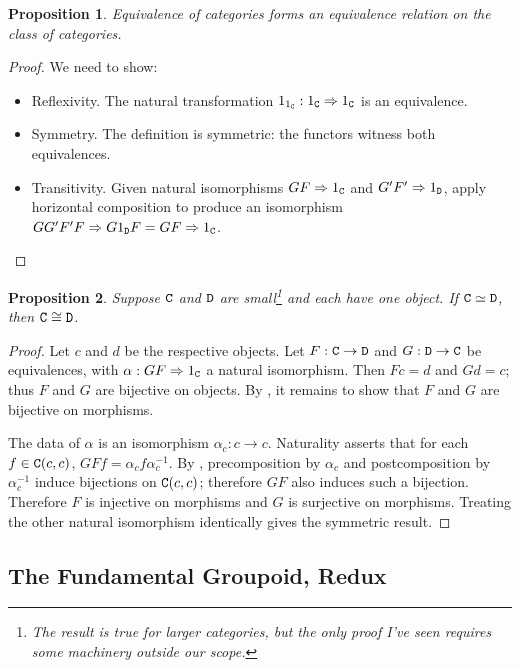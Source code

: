 \documentclass[11 pt]{amsart}
\theoremstyle{plain}   %
\newtheorem{prop}{Proposition}[section]
\theoremstyle{definition}
\theoremstyle{remark}
\numberwithin{equation}{section}
\def\nat{\Rightarrow}
\newcommand{\cat}[1]{{\normalfont\texttt{#1}}}
\begin{document}
\begin{prop}\label{equivalence is equivalence}
	Equivalence of categories forms an equivalence relation on the class of
	categories.
\end{prop}
\begin{proof}
	We need to show:
	\begin{itemize}
		\item Reflexivity. The natural transformation $1_{1_\cat{C}}:
			      1_\cat{C}\nat1_\cat{C}$ is an equivalence.
		\item Symmetry. The definition is symmetric: the functors witness both
		      equivalences.
		\item Transitivity. Given natural isomorphisms $GF\nat 1_\cat{C}$ and
		      $G'F'\nat1_\cat{D}$, apply horizontal composition to produce an
		      isomorphism $GG'F'F\nat G1_\cat{D}F=GF\nat 1_\cat{C}$. \qedhere
	\end{itemize}
\end{proof}

\begin{prop}\label{one object equivalence is isomorphism}
	Suppose $\cat{C}$ and $\cat{D}$ are small\footnote{The result is true for
		larger categories, but the only proof I've seen requires some machinery
		outside our scope.} and each have one object. If $\cat{C}\simeq\cat{D}$, then
	$\cat{C}\cong\cat{D}$.
\end{prop}

\begin{proof}
	Let $c$ and $d$ be the respective objects. Let $F:\cat{C}\rightarrow\cat{D}$
	and $G: \cat{D}\rightarrow\cat{C}$ be equivalences, with $\alpha:
		GF\nat 1_\cat{C}$ a natural isomorphism. Then $Fc = d$ and $Gd = c$;
	thus $F$ and $G$ are bijective on objects. By , it remains to show that $F$ and $G$ are bijective on morphisms.

	The data of $\alpha$ is an isomorphism $\alpha_c: c\rightarrow c$. Naturality
	asserts that for each $f\in\cat{C}(c, c)$, $GFf = \alpha_cf\alpha_c^{-1}$. By
	, precomposition by $\alpha_c$ and
	postcomposition by $\alpha_c^{-1}$ induce bijections on $\cat{C}(c, c)$;
	therefore $GF$ also induces such a bijection. Therefore $F$ is injective on
	morphisms and $G$ is surjective on morphisms. Treating the other natural
	isomorphism identically gives the symmetric result.
\end{proof}

\subsection{The Fundamental Groupoid, Redux}
\end{document}
